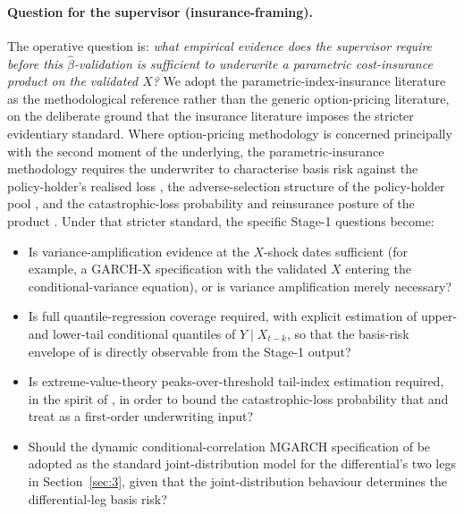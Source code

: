 \paragraph{Question for the supervisor (insurance-framing).} The
operative question is: \emph{what empirical evidence does the supervisor
require before this \(\hat{\beta}\)-validation is sufficient to underwrite a
parametric cost-insurance product on the validated \(X\)?} We adopt the
parametric-index-insurance literature
\citep{carter_etal_2017,mahul_stutley_2010,clarke_2016} as the
methodological reference rather than the generic option-pricing
literature, on the deliberate ground that the insurance literature
imposes the stricter evidentiary standard. Where option-pricing
methodology is concerned principally with the second moment of the
underlying, the parametric-insurance methodology requires the
underwriter to characterise basis risk against the policy-holder's
realised loss \citep{clarke_2016}, the adverse-selection structure of the
policy-holder pool \citep{mahul_stutley_2010}, and the catastrophic-loss
probability and reinsurance posture of the product
\citep{carter_etal_2017,mahul_stutley_2010}. Under that stricter
standard, the specific Stage-1 questions become:

\begin{itemize}
  \item Is variance-amplification evidence at the \(X\)-shock dates
    sufficient (for example, a GARCH-X specification with the validated
    \(X\) entering the conditional-variance equation), or is variance
    amplification merely necessary?
  \item Is full quantile-regression coverage required, with explicit
    estimation of upper- and lower-tail conditional quantiles of
    \(Y \mid X_{t-k}\), so that the basis-risk envelope of
    \citet{clarke_2016} is directly observable from the Stage-1 output?
  \item Is extreme-value-theory peaks-over-threshold tail-index estimation
    required, in the spirit of
    \citet{embrechts_kluppelberg_mikosch_1997}, in order to bound the
    catastrophic-loss probability that
    \citet{carter_etal_2017} and \citet{mahul_stutley_2010} treat as a
    first-order underwriting input?
  \item Should the dynamic conditional-correlation MGARCH specification of
    \citet{engle_2002} be adopted as the standard joint-distribution model
    for the differential's two legs in
    Section~\ref{sec:3}, given that the joint-distribution behaviour
    determines the differential-leg basis risk?
\end{itemize}

